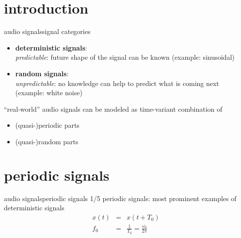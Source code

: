     \section[intro]{introduction}
        \begin{frame}{audio signals}{signal categories}
            \begin{itemize}
                \item	\textbf{deterministic signals}:\\
                        \textit{predictable}: future shape of the signal can be known (example: sinusoidal)
                \pause		
                \item	\textbf{random signals}:\\
                        \textit{unpredictable}: no knowledge can help to predict what is coming next (example: white noise)
            \end{itemize}
            
            \bigskip
            \pause
            ``real-world'' audio signals can be modeled as time-variant combination of 
            \begin{itemize}
                \item	(quasi-)periodic parts
                \item	(quasi-)random parts
            \end{itemize}
        \end{frame}

    \section[periodic signals]{periodic signals}
        \begin{frame}{audio signals}{periodic signals 1/5}
            \vspace{-2mm}
            periodic signals: most prominent examples of deterministic signals
            \begin{eqnarray*}
                x(t) 	&=& x(t+T_0)\\
                f_0 	&=& \frac{1}{T_0} =  \frac{\omega_0}{2\pi}
            \end{eqnarray*}

        \end{frame}

